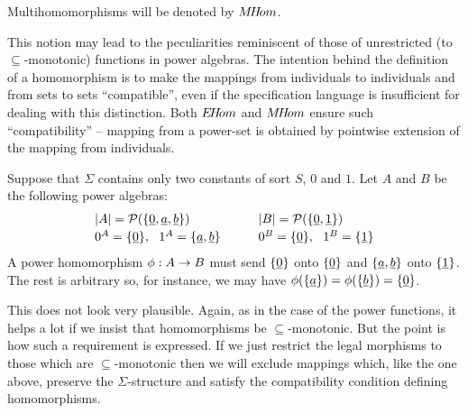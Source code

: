 Multihomomorphisms will be denoted by $M\!H\!om$.

This notion may lead to the 
peculiarities reminiscent of those of unrestricted 
(to $\subseteq$-monotonic) 
functions in power algebras. The intention behind 
the definition of a homomorphism is to make 
the mappings from individuals to individuals and from sets to sets 
``compatible'', even if the specification language 
is insufficient for dealing with this distinction.  Both $E\!H\!om$ and 
$M\!H\!om$ ensure such ``compatibility''  
 --   mapping from a power-set is obtained by pointwise extension 
of the mapping from individuals.

\begin{Example}\label{ex:212} 
Suppose that 
$\Sigma$ contains only two constants of sort $S$, $0$ and $1$. Let 
$A$ and $B$ be the following power algebras: 
\[ \begin{array}{l@{\ \ \ \ \ \ \ \ \ }l}
\Car A = \PSet(\{\und 0, \und a, \und b\}) & \Car B = \PSet(\{\und 0, 
\und 1\}) \\[.5ex]
0^{A}=\{\und 0\},\ \ 1^{A}=\{\und a, \und b\} & 
  0^{B}=\{\und 0\},\ \ 1^{B}=\{\und 1\} 
  \end{array}
\]
\noindent
A power homomorphism  $\phi:A\mathrel{\rightarrow} B$ must send 
$\{\underline{0}\}$ onto $\{\underline{0}\}$ and $\{\underline{a},\underline{b}\}$ onto $\{\underline{1}\}$.  The rest is arbitrary so, for instance, 
we may have $\phi(\{\underline{a}\}) = \phi(\{\underline{b}\}) = \{\underline{0}\}$. 
\end{Example}

This does not look very plausible. 
Again, as in the case of the power functions, it helps a lot if we 
insist that homomorphisms be $\subseteq$-monotonic. 
But the point is how such a requirement is expressed. If 
we just restrict the legal morphisms to those which are $\subseteq$-monotonic 
then we will exclude mappings which, like the one 
above, preserve the $\Sigma$-structure and satisfy the compatibility condition defining 
homomorphisms.

